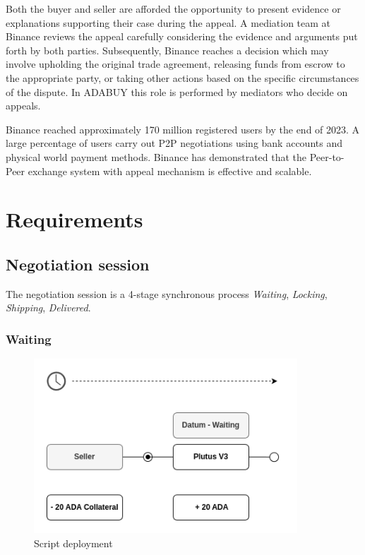 \documentclass[12pt]{article}
\begin{document}
Both the buyer and seller are afforded the opportunity to present evidence or explanations supporting their case during the appeal. A mediation team at Binance reviews the appeal carefully considering the evidence and arguments put forth by both parties. Subsequently, Binance reaches a decision which may involve upholding the original trade agreement, releasing funds from escrow to the appropriate party, or taking other actions based on the specific circumstances of the dispute. In ADABUY this role is performed by mediators who decide on appeals.

Binance reached approximately 170 million registered users by the end of 2023. A large percentage of users carry out P2P negotiations using bank accounts and physical world payment methods. Binance has demonstrated that the Peer-to-Peer exchange system with appeal mechanism is effective and scalable.


\section{ Requirements }

\subsection { Negotiation session }

The negotiation session is a 4-stage synchronous process \emph{Waiting}, \emph{Locking}, \emph{Shipping}, \emph{Delivered}.

\subsubsection { Waiting }

\begin{figure}[ht]
  \centering
  \includegraphics[width=0.88\textwidth, keepaspectratio]{1.png}
  \caption{Script deployment}
  \label{fig:mi_imagen}
\end{figure}
\end{document}
